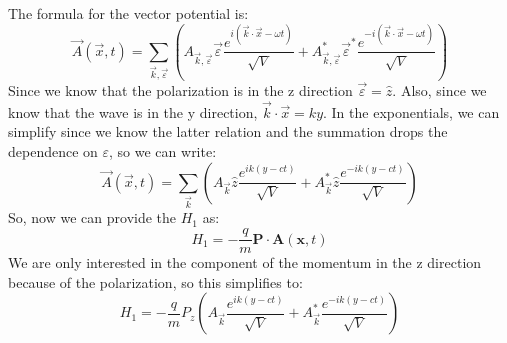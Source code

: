\documentclass[12pt]{article}
\begin{document}
\subsection{}
The formula for the vector potential is:
\begin{equation}
  \vec{A}(\vec{x}, t) = \sum_{\vec{k}, \vec{\varepsilon}} \left( A_{\vec{k}, \vec{\varepsilon}} \vec{\varepsilon} \frac{e^{i(\vec{k} \cdot \vec{x} - \omega t)}}{\sqrt{V}} + A_{\vec{k}, \vec{\varepsilon}}^{*} \vec{\varepsilon}^{*} \frac{e^{-i(\vec{k} \cdot \vec{x} - \omega t)}}{\sqrt{V}} \right)
\end{equation}
Since we know that the polarization is in the z direction $\vec{\varepsilon} = \hat{z}$. Also, since we know that the wave is in the y direction, $\vec{k}\cdot\vec{x}= k y$. In the exponentials, we can simplify since we know the latter relation and the summation drops the dependence on $\varepsilon$, so we can write:
\begin{equation}
  \vec{A}(\vec{x}, t) = \sum_{\vec{k}} \left( A_{\vec{k}} \hat{z} \frac{e^{i k (y-c t)}}{\sqrt{V}} + A_{\vec{k}}^{*} \hat{z} \frac{e^{-i k (y-c t)}}{\sqrt{V}} \right) 
\end{equation}
So, now we can provide the $H_1$ as:
\begin{equation}
  H_1 = -\frac{q}{m} \mathbf{P} \cdot \mathbf{A}(\mathbf{x}, t)
\end{equation}
We are only interested in the component of the momentum in the z direction because of the polarization, so this simplifies to:
\begin{equation}
  H_1 = -\frac{q}{m} P_z \left( A_{\vec{k}} \frac{e^{i k (y-c t)}}{\sqrt{V}} + A_{\vec{k}}^{*} \frac{e^{-i k (y-c t)}}{\sqrt{V}} \right)
\end{equation}
\end{document}
